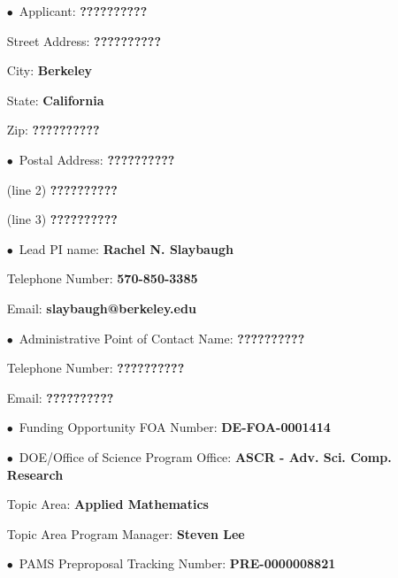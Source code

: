 \documentclass[12pt]{article}
\begin{document}
\begin{itemize}[noitemsep,topsep=0pt,parsep=-2pt,partopsep=20pt,labelwidth=7.5cm,align=left,
itemindent=7.5cm]
\item[$\bullet$\, Applicant:] 					{\bf ??????????}
\item[\quad Street Address:] 					{\bf ??????????}
\item[\quad City:] 									{\bf Berkeley}
\item[\quad State:] 								{\bf California}
\item[\quad Zip:] 									{\bf ??????????}\vspace{12pt}
\item[$\bullet$\, Postal Address:] 			{\bf ??????????}
\item[\quad (line 2)] 								{\bf ??????????}
\item[\quad (line 3)] 								{\bf ??????????}\vspace{12pt}
\item[$\bullet$\, Lead PI name:] 			{\bf Rachel N. Slaybaugh}
\item[\quad Telephone Number:]			{\bf 570-850-3385}
\item[\quad Email:]									{\bf slaybaugh@berkeley.edu}\vspace{12pt}
\item[$\bullet$\, Administrative Point of Contact Name:] {\bf ??????????}
\item[\quad Telephone Number:]			{\bf ??????????}
\item[\quad Email:]									{\bf ??????????}\vspace{12pt}
\item[$\bullet$\, Funding Opportunity FOA Number:] {\bf DE-FOA-0001414}\vspace{8pt}
\item[$\bullet$\, DOE/Office of Science Program Office:] {\bf ASCR - Adv. Sci.
 Comp. Research}
\item[\quad Topic Area:]							{\bf Applied Mathematics}
\item[\quad Topic Area Program Manager:] {\bf Steven Lee}\vspace{12pt}
\item[$\bullet$\, PAMS Preproposal Tracking Number:] {\bf PRE-0000008821}
\end{itemize}

\pagebreak

\end{document}
